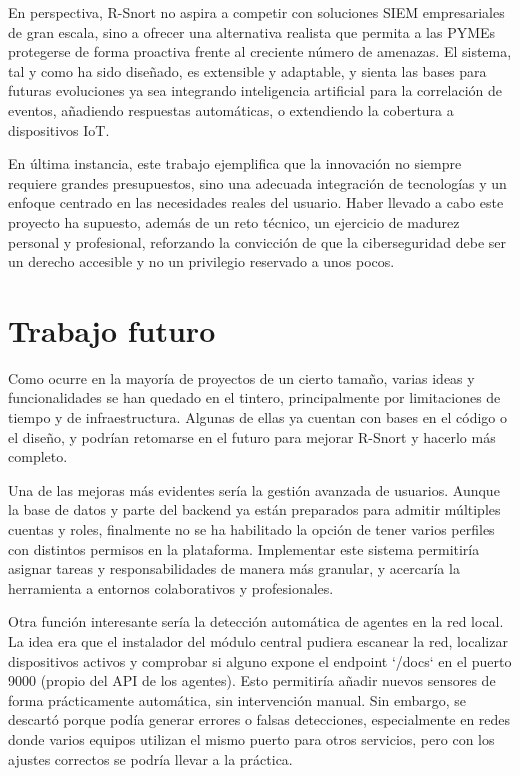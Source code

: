 \documentclass[11pt,a4paper,twoside]{report}
\begin{document}
En perspectiva, R-Snort no aspira a competir con soluciones SIEM empresariales de gran escala, sino a ofrecer una alternativa realista que permita a las PYMEs protegerse de forma proactiva frente al creciente número de amenazas. El sistema, tal y como ha sido diseñado, es extensible y adaptable, y sienta las bases para futuras evoluciones ya sea integrando inteligencia artificial para la correlación de eventos, añadiendo respuestas automáticas, o extendiendo la cobertura a dispositivos IoT.\newline

En última instancia, este trabajo ejemplifica que la innovación no siempre requiere grandes presupuestos, sino una adecuada integración de tecnologías y un enfoque centrado en las necesidades reales del usuario. Haber llevado a cabo este proyecto ha supuesto, además de un reto técnico, un ejercicio de madurez personal y profesional, reforzando la convicción de que la ciberseguridad debe ser un derecho accesible y no un privilegio reservado a unos pocos.


\clearpage
\null
\thispagestyle{empty}
\newpage
\chapter*{Trabajo futuro}

Como ocurre en la mayoría de proyectos de un cierto tamaño, varias ideas y funcionalidades se han quedado en el tintero, principalmente por limitaciones de tiempo y de infraestructura. Algunas de ellas ya cuentan con bases en el código o el diseño, y podrían retomarse en el futuro para mejorar R-Snort y hacerlo más completo.\newline

Una de las mejoras más evidentes sería la gestión avanzada de usuarios. Aunque la base de datos y parte del backend ya están preparados para admitir múltiples cuentas y roles, finalmente no se ha habilitado la opción de tener varios perfiles con distintos permisos en la plataforma. Implementar este sistema permitiría asignar tareas y responsabilidades de manera más granular, y acercaría la herramienta a entornos colaborativos y profesionales.\newline

Otra función interesante sería la detección automática de agentes en la red local. La idea era que el instalador del módulo central pudiera escanear la red, localizar dispositivos activos y comprobar si alguno expone el endpoint `/docs` en el puerto 9000 (propio del API de los agentes). Esto permitiría añadir nuevos sensores de forma prácticamente automática, sin intervención manual. Sin embargo, se descartó porque podía generar errores o falsas detecciones, especialmente en redes donde varios equipos utilizan el mismo puerto para otros servicios, pero con los ajustes correctos se podría llevar a la práctica.\newline
\end{document}
